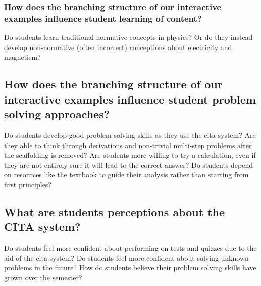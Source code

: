 \subsubsection{How does the branching structure of our interactive examples influence student learning of content?}

Do students learn traditional normative concepts in physics? Or do they instead develop non-normative (often incorrect) conceptions about electricity and magnetism?

\subsection{How does the branching structure of our interactive examples influence student problem solving approaches?}

Do students develop good problem solving skills as they use the \gls{cita} system? Are they able to think through derivations and non-trivial multi-step problems after the scaffolding is removed? Are students more willing to try a calculation, even if they are not entirely sure it will lead to the correct answer? Do students depend on resources like the textbook to guide their analysis rather than starting from first principles?

\subsection{What are students perceptions about the CITA system?}

Do students feel more confident about performing on tests and quizzes due to the aid of the \gls{cita} system? Do students feel more confident about solving unknown problems in the future? How do students believe their problem solving skills have grown over the semester?

